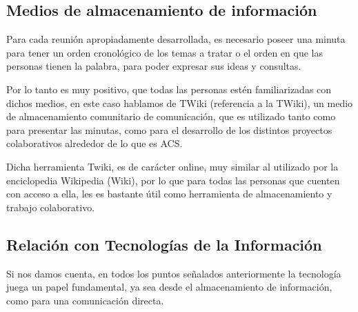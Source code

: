 \subsection{Medios de almacenamiento de información}
Para cada reunión apropiadamente desarrollada,
es necesario poseer una minuta para tener un orden
cronológico de los temas a tratar o el orden
en que las personas tienen la palabra, para poder
expresar sus ideas y consultas.

Por lo tanto es muy positivo, que todas las personas
estén familiarizadas con dichos medios, en este caso hablamos
de TWiki (referencia a la TWiki), un medio de almacenamiento
comunitario de comunicación, que es utilizado tanto como para
presentar las minutas, como para el desarrollo de los distintos
proyectos colaborativos alrededor de lo que es ACS.

Dicha herramienta Twiki, es de carácter online, muy similar al 
utilizado por la enciclopedia Wikipedia (Wiki), por lo que para
todas las personas que cuenten con acceso a ella, les es bastante
útil como herramienta de almacenamiento y trabajo colaborativo.


\subsection{Relación con Tecnologías de la Información}

Si nos damos cuenta, en todos los puntos señalados anteriormente
la tecnología juega un papel fundamental, ya sea desde el
almacenamiento de información, como para una comunicación directa.

